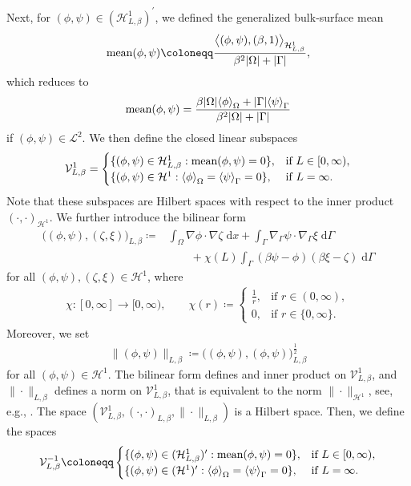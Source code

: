 \documentclass[10pt,reqno]{amsart}
\theoremstyle{remark}
\numberwithin{equation}{section}
\newcommand{\abs}[1]{| #1 |}
\newcommand{\norm}[1]{\| #1 \|}
\newcommand{\bigang}[2]{ \big< #1 , #2  \big>}
\newcommand{\scp}[2]{ ( #1 , #2  )}
\newcommand{\bigscp}[2]{\big( #1 , #2 \big)}
\newcommand{\meano}[1]{{\langle #1 \rangle}_{\Omega}}
\newcommand{\meang}[1]{{\langle #1 \rangle}_{\Gamma}}
\newcommand{\mean}[2]{\textnormal{mean}\scp{#1}{#2}}
\newcommand{\intO}{\int_\Omega}
\newcommand{\intG}{\int_\Gamma}
\newcommand{\dx}{\;\mathrm{d}x}
\newcommand{\dG}{\;\mathrm d\Ga}
\newcommand{\Grad}{\nabla}
\newcommand{\Gradg}{\nabla_\Ga}
\newcommand{\Om}{\Omega}
\newcommand{\Ga}{\Gamma}
\begin{document}
Next, for $(\phi,\psi)\in(\mathcal{H}^1_{L,\beta})^\prime$, we defined the generalized bulk-surface mean
\begin{align*}
	\mean{\phi}{\psi} \coloneqq \frac{\bigang{\scp{\phi}{\psi}}{\scp{\beta}{1}}_{\mathcal{H}^1_{L,\beta}}}{\beta^2\abs{\Om} + \abs{\Ga}},
\end{align*}
which reduces to
\begin{align*}
	\mean{\phi}{\psi} = \frac{\beta\abs{\Om}\meano{\phi} + \abs{\Ga}\meang{\psi}}{\beta^2\abs{\Om} + \abs{\Ga}}
\end{align*}
if $(\phi,\psi)\in\mathcal{L}^2$. We then define the closed linear subspaces
\begin{align*}
	\mathcal{V}^1_{L,\beta} = \begin{cases}
	\{(\phi,\psi)\in\mathcal{H}^1_{L,\beta}:  \mean{\phi}{\psi} = 0\}, &\text{if~}L\in[0,\infty), \\
	\{(\phi,\psi)\in\mathcal{H}^1: \meano{\phi} = \meang{\psi} = 0\}, &\text{if~} L = \infty.
	\end{cases}
\end{align*}
Note that these subspaces are Hilbert spaces with respect to the inner product $\scp{\cdot}{\cdot}_{\mathcal{H}^1}$. We further introduce the bilinear form
\begin{align*}
	\bigscp{\scp{\phi}{\psi}}{\scp{\zeta}{\xi}}_{L,\beta} \coloneqq &\intO \Grad\phi\cdot\Grad\zeta\dx + \intG \Gradg\psi\cdot\Gradg\xi\dG \\
	&\qquad + \chi(L) \intG (\beta\psi - \phi)(\beta\xi - \zeta)\dG
\end{align*}
for all $(\phi,\psi), (\zeta,\xi)\in\mathcal{H}^1$, where
\begin{align*}
	\chi:[0,\infty]\rightarrow [0,\infty), \qquad 
    \chi(r) \coloneqq 
    \begin{cases} 
    \frac{1}{r}, &\text{if~}r\in(0,\infty), \\
	0, &\text{if~} r\in\{0,\infty\}.
	\end{cases}
\end{align*}
Moreover, we set
\begin{align*}
	\norm{(\phi,\psi)}_{L,\beta} \coloneqq \bigscp{\scp{\phi}{\psi}}{\scp{\phi}{\psi}}_{L,\beta}^{\frac12}
\end{align*}
for all $\scp{\phi}{\psi}\in\mathcal{H}^1$. The bilinear form defines and inner product on $\mathcal{V}^1_{L,\beta}$, and $\norm{\cdot}_{L,\beta}$ defines a norm on $\mathcal{V}^1_{L,\beta}$, that is equivalent to the norm $\norm{\cdot}_{\mathcal{H}^1}$, see, e.g., \cite[Corollary A.2]{Knopf2021}. The space $(\mathcal{V}^1_{L,\beta},\scp{\cdot}{\cdot}_{L,\beta},\norm{\cdot}_{L,\beta})$ is a Hilbert space. Then, we define the spaces
\begin{align*}
	\mathcal{V}^{-1}_{L,\beta} \coloneqq \begin{cases} \{(\phi,\psi)\in(\mathcal{H}^1_{L,\beta})^\prime: \mean{\phi}{\psi} = 0\}, &\text{if~} L\in[0,\infty), \\
	\{(\phi,\psi)\in(\mathcal{H}^1)^\prime: \meano{\phi} = \meang{\psi} = 0\}, &\text{if~} L = \infty.
	\end{cases}
\end{align*}
\end{document}
